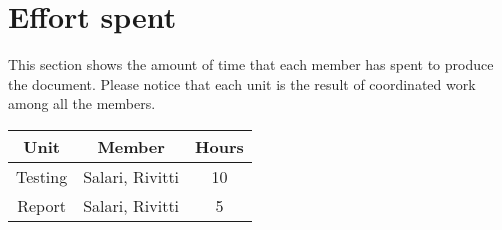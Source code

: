 \chapter{Effort spent}

This section shows the amount of time that each member has spent to produce the document.
Please notice that each unit is the result of coordinated work among all the members.

\begin{table}[h]
    \centering
    \begin{tabular}{|c|c|c|}
        \hline \textbf{Unit} & \textbf{Member} & \textbf{Hours} \\
        \hline Testing & Salari, Rivitti & 10 \\
        \hline Report & Salari, Rivitti & 5 \\
        \hline
    \end{tabular}
\end{table}

